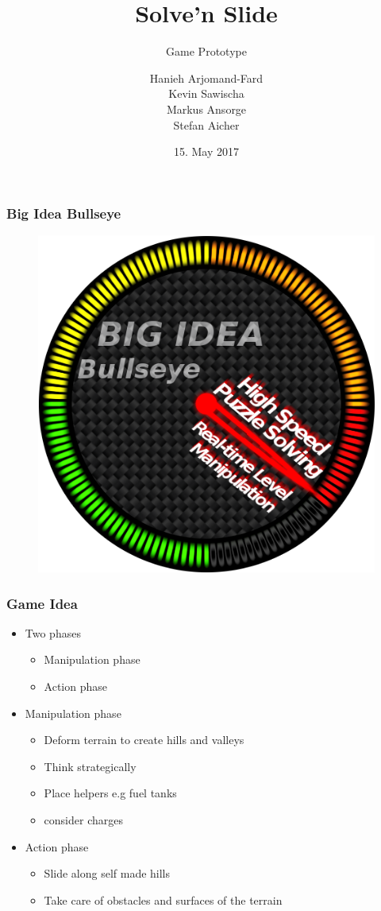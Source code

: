 \documentclass[xcolor=dvipsnames]{beamer}
\title{Solve'n Slide}
\subtitle{Game Prototype}
\author{Hanieh Arjomand-Fard\\Kevin Sawischa\\Markus Ansorge\\Stefan Aicher}
\date{15. May 2017}
\begin{document}
	\maketitle
	\begin{frame}
		\frametitle{Big Idea Bullseye}
		\begin{figure}
			\centering
			\includegraphics[scale=.4]{images/bigIdeaBullseye}
		\end{figure}
	\end{frame}
	
	\begin{frame}
		\frametitle{Game Idea}
		\begin{itemize}
			\item Two phases
				\begin{itemize}
					\item Manipulation phase
					\item Action phase
				\end{itemize}
			\item Manipulation phase
			\begin{itemize}
				\item Deform terrain to create hills and valleys
				\item Think strategically
				\item Place helpers e.g fuel tanks
				\item consider charges
			\end{itemize}
			\item Action phase
			\begin{itemize}
				\item Slide along self made hills
				\item Take care of obstacles and surfaces of the terrain
			\end{itemize}
		\end{itemize}
	\end{frame}
	
\end{document}
